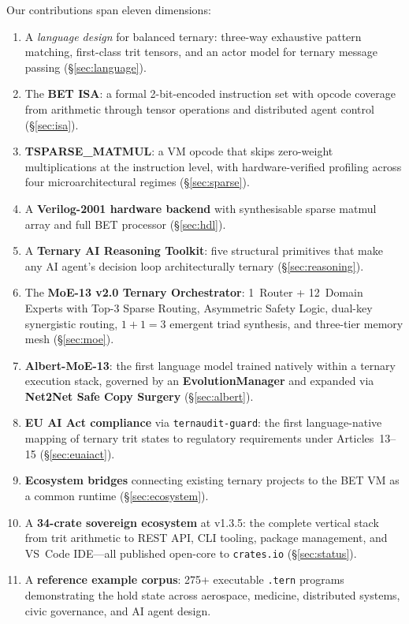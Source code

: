 \documentclass[journal,10pt,twocolumn]{IEEEtran}
\begin{document}
\noindent Our contributions span eleven dimensions:

\begin{enumerate}
  \item A \emph{language design} for balanced ternary: three-way exhaustive
        pattern matching, first-class trit tensors, and an actor model for
        ternary message passing (\S\ref{sec:language}).
  \item The \textbf{BET ISA}: a formal 2-bit-encoded instruction set with
        opcode coverage from arithmetic through tensor operations and
        distributed agent control (\S\ref{sec:isa}).
  \item \textbf{TSPARSE\_MATMUL}: a VM opcode that skips zero-weight
        multiplications at the instruction level, with hardware-verified
        profiling across four microarchitectural regimes (\S\ref{sec:sparse}).
  \item A \textbf{Verilog-2001 hardware backend} with synthesisable sparse
        matmul array and full BET processor (\S\ref{sec:hdl}).
  \item A \textbf{Ternary AI Reasoning Toolkit}: five structural primitives
        that make any AI agent's decision loop architecturally ternary
        (\S\ref{sec:reasoning}).
  \item The \textbf{MoE-13 v2.0 Ternary Orchestrator}: 1~Router + 12~Domain
        Experts with Top-3 Sparse Routing, Asymmetric Safety Logic, dual-key
        synergistic routing, $1{+}1{=}3$ emergent triad synthesis, and
        three-tier memory mesh (\S\ref{sec:moe}).
  \item \textbf{Albert-MoE-13}: the first language model trained natively
        within a ternary execution stack, governed by an \textbf{EvolutionManager}
        and expanded via \textbf{Net2Net Safe Copy Surgery}
        (\S\ref{sec:albert}).
  \item \textbf{EU AI Act compliance} via \texttt{ternaudit-guard}: the
        first language-native mapping of ternary trit states to regulatory
        requirements under Articles~13--15 (\S\ref{sec:euaiact}).
  \item \textbf{Ecosystem bridges} connecting existing ternary projects to
        the BET VM as a common runtime (\S\ref{sec:ecosystem}).
  \item A \textbf{34-crate sovereign ecosystem} at v1.3.5: the complete
        vertical stack from trit arithmetic to REST API, CLI tooling,
        package management, and VS~Code IDE---all published open-core to
        \texttt{crates.io} (\S\ref{sec:status}).
  \item A \textbf{reference example corpus}: 275+ executable \texttt{.tern}
        programs demonstrating the hold state across aerospace, medicine,
        distributed systems, civic governance, and AI agent design.
\end{enumerate}
\end{document}
